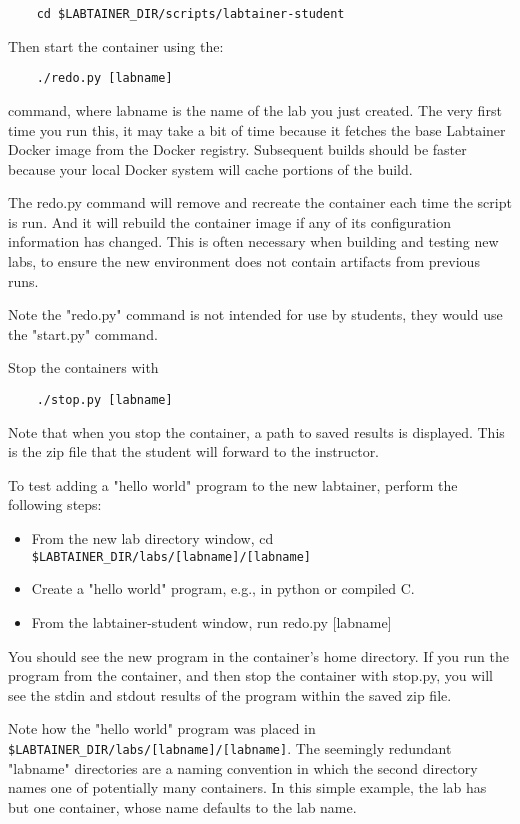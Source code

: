 \documentclass{article}
\begin{document}
\begin{verbatim}
    cd $LABTAINER_DIR/scripts/labtainer-student
\end{verbatim}
Then start the container using the:

\begin{verbatim}
    ./redo.py [labname] 
\end{verbatim}
command, where labname is the name of the lab you just created.  
The very first time you run this, it may take a bit of time because it fetches the 
base Labtainer Docker image from the Docker registry.  Subsequent builds
should be faster because your local Docker system will cache portions of the build.  

The redo.py command will remove and recreate the container
each time the script is run.  And it will rebuild the container image if any of its configuration 
information has changed.  This is often necessary when building and testing new labs, to ensure the
new environment does not contain artifacts from previous runs.

Note the "redo.py" command is not intended for use by students, they would use the "start.py" command.  

Stop the containers with 
\begin{verbatim}
    ./stop.py [labname]
\end{verbatim}
Note that when you stop the container, a path to saved results is displayed.
This is the zip file that the student will forward to the instructor.

To test adding a "hello world" program to the new labtainer, perform the following steps:
\begin{itemize}
\item From the new lab directory window, cd \verb!$LABTAINER_DIR/labs/[labname]/[labname]!
\item Create a "hello world" program, e.g., in python or compiled C.
\item From the labtainer-student window, run redo.py [labname]
\end{itemize}
    
You should see the new program in the container's
home directory.  If you run the program from the container, and then stop the container
with stop.py, you will see the stdin and stdout results of the program within the
saved zip file.

Note how the "hello world" program was placed in \verb!$LABTAINER_DIR/labs/[labname]/[labname]!.
The seemingly redundant "labname" directories are a naming convention in which the
second directory names one of potentially many containers.  In this simple example,
the lab has but one container, whose name defaults to the lab name.
\end{document}
